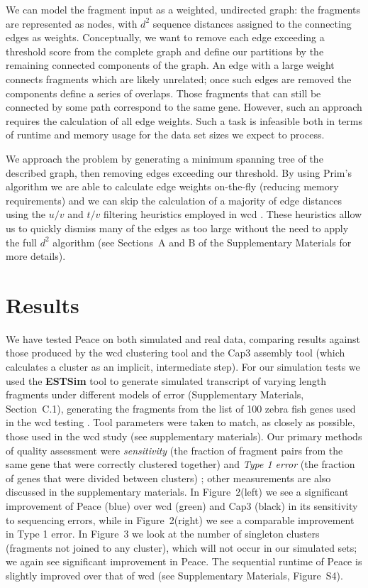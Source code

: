 \documentclass[a4,center,fleqn]{NAR}
\begin{document}
We can model the fragment input as a weighted, undirected graph: the fragments
are represented as nodes, with $d^2$ sequence distances assigned to
the connecting edges as weights.  Conceptually, we want to remove each
edge exceeding a threshold score from the complete graph and define
our partitions by the remaining connected components of the graph.  An
edge with a large weight connects fragments which are likely unrelated;
once such edges are removed the components define a series of
overlaps.  Those fragments that can still be connected by some path
correspond to the same gene.  However, such an approach requires the
calculation of all edge weights.  Such a task is infeasible both in terms of
runtime and memory usage for the data set sizes we expect to process.

We approach the problem by generating a minimum spanning tree of the
described graph, then removing edges exceeding our threshold.  By
using Prim's algorithm we are able to calculate edge weights
on-the-fly (reducing memory requirements) and we can skip the
calculation of a majority of edge distances using the $u/v$ and $t/v$
filtering heuristics employed in {\sc wcd} \cite{Hazelhurst08a}.
These heuristics allow us to quickly dismiss many of the edges as too
large without the need to apply the full $d^2$ algorithm (see
Sections~A and B of the Supplementary Materials for more details). 

\section{Results}

We have tested {\sc Peace} on both simulated and real data,
comparing results against those produced by the {\sc wcd}
clustering tool \cite{Hazelhurst08a} and the {\sc Cap3} assembly
tool \cite{Huang99} (which calculates a cluster as an implicit, intermediate
step).  For our simulation tests we used the {\bf ESTSim} tool
\cite{Hazelhurst03} to generate simulated transcript of varying length
fragments under different models
of error (Supplementary Materials, Section~C.1),
generating the fragments from the list of 100 zebra fish genes used in
the {\sc wcd} testing \cite{Hazelhurst08a}.  Tool parameters were
taken to match, as closely as possible, those used in the {\sc wcd}
study (see supplementary materials).  Our primary methods of quality
assessment were {\it sensitivity} (the fraction of fragment pairs from the
same gene that were correctly clustered together) and {\it Type 1
  error} (the fraction of genes that were divided between clusters)
\cite{Wang04,Hazelhurst08a}; other measurements are also discussed
in the supplementary materials.  In Figure~2(left) we see a
significant improvement of {\sc Peace} (blue) over {\sc wcd}
(green) and {\sc Cap3} (black) in its sensitivity to sequencing
errors, while in Figure~2(right) we see a comparable
improvement in Type 1 error.  In Figure~3 we look at
the number of singleton clusters (fragments not joined to any cluster),
which will not occur in our simulated sets; we again see significant
improvement in {\sc Peace}.  The sequential runtime of
{\sc Peace} is slightly improved over that of {\sc wcd} (see
Supplementary Materials, Figure~S4).
\end{document}
